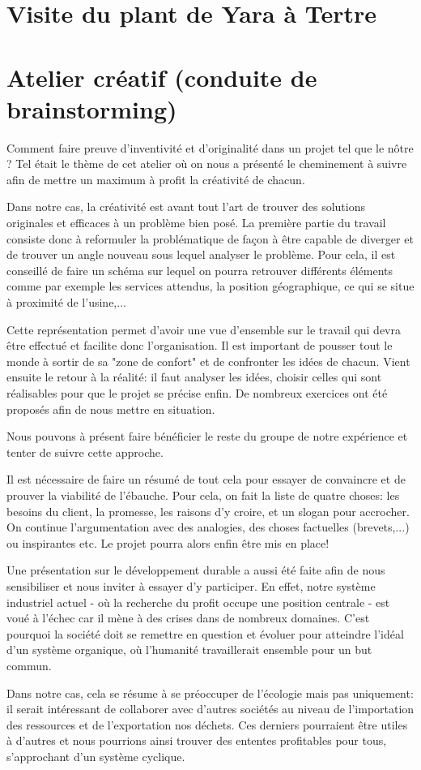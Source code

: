 \documentclass[a4paper, oneside, 12pt]{article}
\begin{document}
\section{Visite du plant de Yara à Tertre}

\section{Atelier créatif (conduite de brainstorming)}

Comment faire preuve d'inventivité et d'originalité dans un projet tel que le nôtre ? Tel était le thème de cet atelier où on nous a présenté le cheminement à suivre afin de mettre un maximum à profit la créativité de chacun.

Dans notre cas, la créativité est avant tout l'art de trouver des solutions originales et efficaces à un problème bien posé. La première partie du travail consiste donc à reformuler la problématique de façon à être capable de diverger et de trouver un angle nouveau sous lequel analyser le problème. Pour cela, il est conseillé de faire un schéma 
sur lequel on pourra retrouver différents éléments comme par exemple les services attendus, la position géographique, ce qui se situe à proximité de l’usine,... 

Cette représentation permet d'avoir une vue d'ensemble sur le travail qui devra être effectué et facilite donc l'organisation. Il est important de pousser tout le monde à sortir de sa "zone de confort" et de confronter les idées de chacun. Vient ensuite le retour à la réalité: il faut analyser les idées, choisir celles qui sont réalisables pour que le projet se précise enfin. De nombreux exercices ont été proposés afin de nous mettre en situation. 

Nous pouvons à présent faire bénéficier le reste du groupe de notre expérience et tenter de suivre cette approche.

Il est nécessaire de faire un résumé de tout cela pour essayer de convaincre et de prouver la viabilité de l'ébauche. Pour cela, on fait la liste de quatre choses: les besoins du client, la promesse, les raisons d'y croire, et un slogan pour accrocher. On continue l'argumentation avec des analogies, des choses factuelles (brevets,...) ou inspirantes etc. Le projet pourra alors enfin être mis en place!

Une présentation sur le développement durable a aussi été faite afin de nous sensibiliser et nous inviter à essayer d'y participer. En effet, notre système industriel actuel - où la recherche du profit occupe une position centrale - est voué à l'échec car il mène à des crises dans de nombreux domaines. C'est pourquoi la société doit se remettre en question et évoluer pour atteindre l'idéal d'un système organique, où l'humanité travaillerait ensemble pour un but commun. 

Dans notre cas, cela se résume à se préoccuper de l'écologie mais pas uniquement: il serait intéressant de collaborer avec d'autres sociétés au niveau de l'importation des ressources et de l'exportation nos déchets. Ces derniers pourraient être utiles à d'autres et nous pourrions ainsi trouver des ententes profitables pour tous, s'approchant d'un système cyclique.
\end{document}

